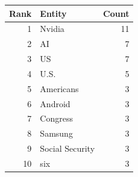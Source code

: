 \begin{tabular}{rlr}
\toprule
Rank & Entity & Count \\
\midrule
1 & Nvidia & 11 \\
2 & AI & 7 \\
3 & US & 7 \\
4 & U.S. & 5 \\
5 & Americans & 3 \\
6 & Android & 3 \\
7 & Congress & 3 \\
8 & Samsung & 3 \\
9 & Social Security & 3 \\
10 & six & 3 \\
\bottomrule
\end{tabular}
